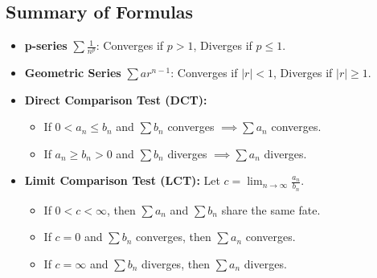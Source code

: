 \documentclass{article}
\begin{document}
\subsection{Summary of Formulas}
\begin{itemize}
    \item \textbf{p-series} \(\sum \frac{1}{n^p}\): Converges if \(p>1\), Diverges if \(p \leq 1\).
    \item \textbf{Geometric Series} \(\sum ar^{n-1}\): Converges if \(|r|<1\), Diverges if \(|r| \geq 1\).
    \item \textbf{Direct Comparison Test (DCT):}
        \begin{itemize}
            \item If \(0 < a_n \leq b_n\) and \(\sum b_n\) converges \(\implies \sum a_n\) converges.
            \item If \(a_n \geq b_n > 0\) and \(\sum b_n\) diverges \(\implies \sum a_n\) diverges.
        \end{itemize}
    \item \textbf{Limit Comparison Test (LCT):} Let \(c = \lim_{n \to \infty} \frac{a_n}{b_n}\).
        \begin{itemize}
            \item If \(0 < c < \infty\), then \(\sum a_n\) and \(\sum b_n\) share the same fate.
            \item If \(c=0\) and \(\sum b_n\) converges, then \(\sum a_n\) converges.
            \item If \(c=\infty\) and \(\sum b_n\) diverges, then \(\sum a_n\) diverges.
        \end{itemize}
\end{itemize}
\end{document}
